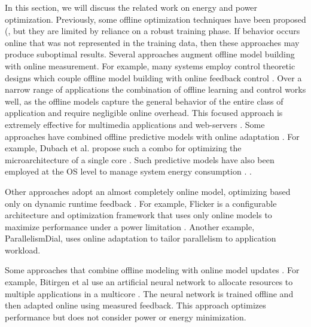 \label{sec:related}
In this section, we will discuss the related work on energy and power optimization.
Previously, some offline
optimization techniques have been proposed (\eg \cite{Yi2003,LeeBrooks2006,CPR,ChenJohn2011,petabricksStatic},
but they are limited by reliance on a robust training phase.  If behavior
occurs online that was not represented in the training data, then
these approaches may produce suboptimal results. Several approaches augment
offline model building with online
measurement.  For example, many systems employ control theoretic
designs which couple offline model building with online feedback
control
\cite{Wu2004,TCST,Chen2011,PTRADE,Heartbeats2,ControlWare,Agilos,Rajkumar,Sojka,Raghavendra2008}.
Over a narrow range of applications the combination of offline
learning and control works well, as the offline models capture the
general behavior of the entire class of application and require
negligible online overhead.  This focused approach is extremely
effective for multimedia applications
\cite{grace2,flinn99,flinn2004,xtune,TCST} and web-servers
\cite{Horvarth,LuEtAl-2006a,SunDaiPan-2008a}.
Some approaches have combined offline predictive models with online
adaptation
\cite{Zhang2012,packandcap,Winter2010,dubach2010,Koala,Cinder, wu2012inferred}.  For
example, Dubach et al.  propose such a combo for optimizing the
microarchitecture of a single core \cite{dubach2010}.  Such predictive
models have also been employed at the OS level to manage system energy
consumption \cite{Koala,Cinder}. \cite{wu2012inferred}.

Other approaches adopt an almost completely online model, optimizing
based only on dynamic runtime feedback
\cite{Li2006,Flicker,ParallelismDial,Ponamarev,petabricksDynamic,LeeBrooks}.
For example, Flicker is a configurable architecture and optimization
framework that uses only online models to maximize performance under a
power limitation \cite{Flicker}.  Another example, ParallelismDial,
uses online adaptation to tailor parallelism to application workload.


Some approaches that
combine offline modeling with online model updates
\cite{ICSE2014,Bitirgen2008}.  For example, Bitirgen et al use an
artificial neural network to allocate resources to multiple
applications in a multicore \cite{Bitirgen2008}.  The neural network
is trained offline and then adapted online using measured feedback.
This approach optimizes performance but does not consider power or
energy minimization.

